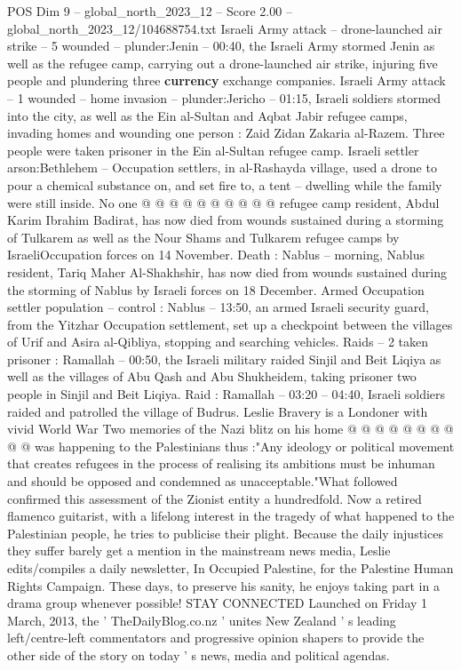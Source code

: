\begin{textsample}{POS Dim 9 – global\_north\_2023\_12 – Score 2.00 – global\_north\_2023\_12/104688754.txt}
Israeli Army attack -- drone-launched air strike -- 5 wounded -- plunder:Jenin -- 00:40, the Israeli Army stormed Jenin as well as the refugee camp, carrying out a drone-launched air strike, injuring five people and plundering three \textbf{currency} exchange companies.
Israeli Army attack -- 1 wounded -- home invasion -- plunder:Jericho -- 01:15, Israeli soldiers stormed into the city, as well as the Ein al-Sultan and Aqbat Jabir refugee camps, invading homes and wounding one person : Zaid Zidan Zakaria al-Razem.
Three people were taken prisoner in the Ein al-Sultan refugee camp.
Israeli settler arson:Bethlehem -- Occupation settlers, in al-Rashayda village, used a drone to pour a chemical substance on, and set fire to, a tent -- dwelling while the family were still inside.
No one @ @ @ @ @ @ @ @ @ @ refugee camp resident, Abdul Karim Ibrahim Badirat, has now died from wounds sustained during a storming of Tulkarem as well as the Nour Shams and Tulkarem refugee camps by IsraeliOccupation forces on 14 November.
Death : Nablus -- morning, Nablus resident, Tariq Maher Al-Shakhshir, has now died from wounds sustained during the storming of Nablus by Israeli forces on 18 December.
Armed Occupation settler population -- control : Nablus -- 13:50, an armed Israeli security guard, from the Yitzhar Occupation settlement, set up a checkpoint between the villages of Urif and Asira al-Qibliya, stopping and searching vehicles.
Raids -- 2 taken prisoner : Ramallah -- 00:50, the Israeli military raided Sinjil and Beit Liqiya as well as the villages of Abu Qash and Abu Shukheidem, taking prisoner two people in Sinjil and Beit Liqiya.
Raid : Ramallah -- 03:20 -- 04:40, Israeli soldiers raided and patrolled the village of Budrus.
Leslie Bravery is a Londoner with vivid World War Two memories of the Nazi blitz on his home @ @ @ @ @ @ @ @ @ @ was happening to the Palestinians thus :"Any ideology or political movement that creates refugees in the process of realising its ambitions must be inhuman and should be opposed and condemned as unacceptable."What followed confirmed this assessment of the Zionist entity a hundredfold.
Now a retired flamenco guitarist, with a lifelong interest in the tragedy of what happened to the Palestinian people, he tries to publicise their plight.
Because the daily injustices they suffer barely get a mention in the mainstream news media, Leslie edits/compiles a daily newsletter, In Occupied Palestine, for the Palestine Human Rights Campaign.
These days, to preserve his sanity, he enjoys taking part in a drama group whenever possible!
STAY CONNECTED Launched on Friday 1 March, 2013, the ' TheDailyBlog.co.nz ' unites New Zealand ' s leading left/centre-left commentators and progressive opinion shapers to provide the other side of the story on today ' s news, media and political agendas.

\end{textsample}
